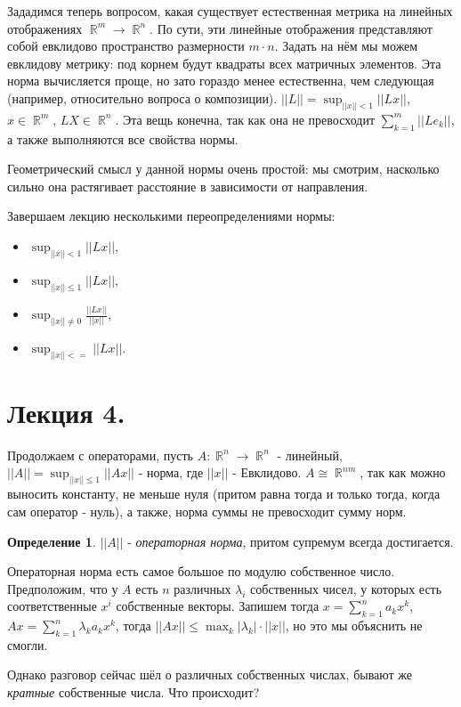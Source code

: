 \documentclass[a4paper,100pt]{article}
\theoremstyle{indented}
\theoremstyle{definition}
\newtheorem{defn}{Определение}
\theoremstyle{remark}
\DeclareMathOperator{\RR}{\mathbb{R}}
\begin{document}
Зададимся теперь вопросом, какая существует естественная метрика на линейных отображениях $\RR^m\rightarrow \RR^n$. По сути, эти линейные отображения представляют собой евклидово пространство размерности $m\cdot n$. Задать на нём мы можем евклидову метрику: под корнем будут квадраты всех матричных элементов. Эта норма вычисляется проще, но зато гораздо менее естественна, чем следующая (например, относительно вопроса о композиции). $||L||=\sup_{||x||<1}||Lx||$, $x\in \RR^m$, $LX\in \RR^n$. Эта вещь конечна, так как она не превосходит $\sum_{k=1}^m ||Le_k||$, а также выполняются все свойства нормы. \ 

Геометрический смысл у данной нормы очень простой: мы смотрим, насколько сильно она растягивает расстояние в зависимости от направления. \ 

Завершаем лекцию несколькими переопределениями нормы: 
\begin{itemize}
    \item $\sup_{||x||<1}||Lx||$, 
    \item $\sup_{||x||\leq 1}||Lx||$, 
    \item $\sup_{||x||\neq 0}\frac{||Lx||}{||x||}$, 
    \item $\sup_{||x||<=}||Lx||$.
\end{itemize}

\section{Лекция 4.}

Продолжаем с операторами, пусть $A: \RR^n\rightarrow \RR^n$ - линейный, $||A||=\sup_{||x||\leq 1}||Ax||$ - норма, где $||x||$ - Евклидово. $A\cong \RR^{nm}$, так как можно выносить константу, не меньше нуля (притом равна тогда и только тогда, когда сам оператор - нуль), а также, норма суммы не превосходит сумму норм. 

\begin{defn}
    $||A||$ - \textit{операторная норма}, притом супремум всегда достигается. 
\end{defn}

Операторная норма есть самое большое по модулю собственное число. Предположим, что у $A$ есть $n$ различных $\lambda_i$ собственных чисел, у которых есть соответственные $x^i$ собственные векторы. Запишем тогда $x=\sum_{k=1}^n a_kx^k$, $Ax=\sum_{k=1}^n \lambda_k a_kx^k$, тогда $||Ax||\leq\max_k|\lambda_k|\cdot||x||$, но это мы объяснить не смогли. \ 

Однако разговор сейчас шёл о различных собственных числах, бывают же \textit{кратные} собственные числа. Что происходит? \ 
\end{document}
